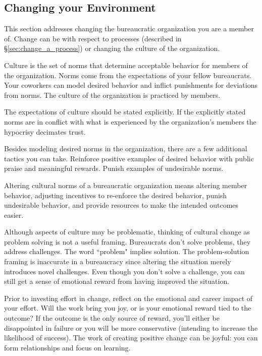 \subsection{Changing your Environment}


This section addresses changing the bureaucratic organization you are a member of. Change can be with respect to processes (described in \S\ref{sec:change_a_process}) or changing the \gls{culture} of the organization.

Culture is the set of norms that determine acceptable behavior for members of the organization. Norms come from the expectations of your fellow bureaucrats. Your coworkers can model desired behavior and inflict punishments for deviations from norms. The culture of the organization is practiced by members. 

The expectations of culture should be stated explicitly. If the explicitly stated norms are in conflict with what is experienced by the organization's members the hypocrisy decimates trust. 

Besides modeling desired norms in the organization, there are a few additional tactics you can take. 
Reinforce positive examples of desired behavior with public praise and meaningful rewards. Punish examples of undesirable norms. 

Altering cultural norms of a bureaucratic organization means altering member behavior, adjusting incentives to re-enforce the desired behavior, punish undesirable behavior, and provide resources to make the intended outcomes easier. 

Although aspects of culture may be problematic, thinking of cultural change as problem solving is not a useful framing. Bureaucrats don't solve problems, they address challenges. The word ``problem" implies solution. The problem-solution framing is inaccurate in a bureaucracy since altering the situation merely introduces novel challenges. 
Even though you don't solve a challenge, you can still get a sense of emotional reward from having improved the situation. 

Prior to investing effort in change, reflect on the emotional and career impact of your effort. Will the work bring you joy, or is your emotional reward tied to the outcome? If the outcome is the only source of reward, you'll either be disappointed in failure or you will be more conservative (intending to increase the likelihood of success). The work of creating positive change can be joyful: you can form relationships and focus on learning. 

